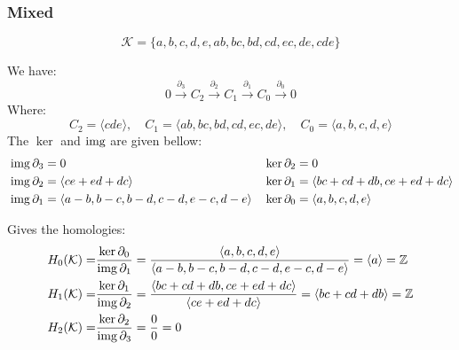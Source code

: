 \subsubsection{Mixed}
\begin{center}
\end{center}
\[\mathcal{K}=\{a,b,c,d,e,ab,bc,bd,cd,ec,de,cde\}\]

We have:
\[0 \stackrel{\partial_3}{\longrightarrow} C_2 \stackrel{\partial_2}{\longrightarrow} C_1 \stackrel{\partial_1}{\longrightarrow} C_0 \stackrel{\partial_0}{\longrightarrow} 0\]
Where:
\[C_2 = \langle cde \rangle,\quad C_1 = \langle ab,bc,bd,cd,ec,de \rangle,\quad C_0 = \langle a,b,c,d,e \rangle\]
The $\ker$ and $\operatorname{img}$ are given bellow:
\begin{equation*}
\begin{aligned}
	&\operatorname{img} \partial_3 = 0 && \ker \partial_2 = 0\\
	&\operatorname{img} \partial_2 = \langle ce+ed+dc\rangle && \ker \partial_1 = \langle bc+cd+db, ce+ed+dc\rangle\\
	&\operatorname{img} \partial_1 = \langle a-b,b-c,b-d,c-d,e-c,d-e \rangle && \ker \partial_0 = \langle a,b,c,d,e\rangle\\
\end{aligned}
\end{equation*}

Gives the homologies:
\begin{equation*}
\begin{aligned}
	H_0(\mathcal{K}) =& \frac{\ker\partial_0}{\operatorname{img}\partial_1} = \frac{\langle a,b,c,d,e\rangle}{\langle a-b,b-c,b-d,c-d,e-c,d-e\rangle} = \langle a\rangle = \mathbb{Z}\\
	H_1(\mathcal{K}) =& \frac{\ker\partial_1}{\operatorname{img}\partial_2} = \frac{\langle bc+cd+db,ce+ed+dc\rangle}{\langle ce+ed+dc\rangle} = \langle bc+cd+db\rangle = \mathbb{Z}\\
	H_2(\mathcal{K}) =& \frac{\ker\partial_2}{\operatorname{img}\partial_3} = \frac{0}{0} = 0\\
\end{aligned}
\end{equation*}

